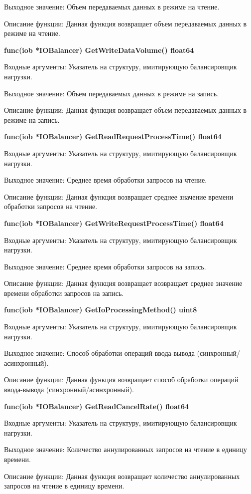 Выходное значение: Объем передаваемых данных в режиме на чтение.

Описание функции: Данная функция возвращает объем передаваемых данных в режиме на чтение.

\textbf{func(iob *IOBalancer) GetWriteDataVolume() float64}

Входные аргументы: Указатель на структуру, имитирующую балансировщик нагрузки.

Выходное значение: Объем передаваемых данных в режиме на запись. 

Описание функции: Данная функция возвращает объем передаваемых данных в режиме на запись.

\textbf{func(iob *IOBalancer) GetReadRequestProcessTime() float64}

Входные аргументы: Указатель на структуру, имитирующую балансировщик нагрузки.

Выходное значение: Среднее время обработки запросов на чтение.

Описание функции: Данная функция возвращает среднее значение времени обработки запросов на чтение.

\textbf{func(iob *IOBalancer) GetWriteRequestProcessTime() float64}

Входные аргументы: Указатель на структуру, имитирующую балансировщик нагрузки.

Выходное значение: Среднее время обработки запросов на запись.

Описание функции: Данная функция возвращает возвращает среднее значение времени обработки запросов на запись.

\textbf{func(iob *IOBalancer) GetIoProcessingMethod() uint8}

Входные аргументы: Указатель на структуру, имитирующую балансировщик нагрузки.

Выходное значение: Способ обработки операций ввода-вывода (синхронный/асинхронный).

Описание функции: Данная функция возвращает способ обработки операций ввода-вывода (синхронный/асинхронный).

\textbf{func(iob *IOBalancer) GetReadCancelRate() float64}

Входные аргументы: Указатель на структуру, имитирующую балансировщик нагрузки.

Выходное значение: Количество аннулированных запросов на чтение в единицу времени.

Описание функции: Данная функция возвращает количество аннулированных запросов на чтение в единицу времени.


